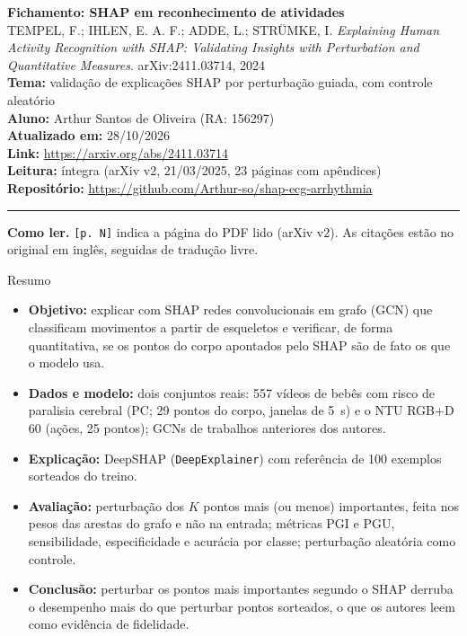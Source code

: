 \documentclass[11pt,a4paper]{article}
\begin{document}
\begin{center}
    {\LARGE \textbf{Fichamento: SHAP em reconhecimento de atividades}} \\[0.35em]
    {\large TEMPEL, F.; IHLEN, E. A. F.; ADDE, L.; STRÜMKE, I. \textit{Explaining Human Activity Recognition with SHAP: Validating Insights with Perturbation and Quantitative Measures}. arXiv:2411.03714, 2024} \\[0.3em]
    \textbf{Tema:} validação de explicações SHAP por perturbação guiada, com controle aleatório \\[0.2em]
    \textbf{Aluno:} Arthur Santos de Oliveira (RA: 156297) \\[0.2em]
    \textbf{Atualizado em:} 28/10/2026 \\[0.2em]
    \textbf{Link:} \url{https://arxiv.org/abs/2411.03714} \\[0.2em]
    \textbf{Leitura:} íntegra (arXiv v2, 21/03/2025, 23 páginas com apêndices) \\[0.2em]
    \textbf{Repositório:} \url{https://github.com/Arthur-so/shap-ecg-arrhythmia}
\end{center}
\vspace{-0.5em}
\hrule
\vspace{0.8em}

\textbf{Como ler.} \texttt{[p. N]} indica a página do PDF lido (arXiv v2). As citações estão no original em inglês, seguidas de tradução livre.

\begin{infobox}[note]{Resumo}
\begin{itemize}
\item \textbf{Objetivo:} explicar com SHAP redes convolucionais em grafo (GCN) que classificam movimentos a partir de esqueletos e verificar, de forma quantitativa, se os pontos do corpo apontados pelo SHAP são de fato os que o modelo usa.
\item \textbf{Dados e modelo:} dois conjuntos reais: 557 vídeos de bebês com risco de paralisia cerebral (PC; 29 pontos do corpo, janelas de 5~s) e o NTU RGB+D 60 (ações, 25 pontos); GCNs de trabalhos anteriores dos autores.
\item \textbf{Explicação:} DeepSHAP (\texttt{DeepExplainer}) com referência de 100 exemplos sorteados do treino.
\item \textbf{Avaliação:} perturbação dos $K$ pontos mais (ou menos) importantes, feita nos pesos das arestas do grafo e não na entrada; métricas PGI e PGU, sensibilidade, especificidade e acurácia por classe; perturbação aleatória como controle.
\item \textbf{Conclusão:} perturbar os pontos mais importantes segundo o SHAP derruba o desempenho mais do que perturbar pontos sorteados, o que os autores leem como evidência de fidelidade.
\end{itemize}
\end{infobox}
\end{document}
